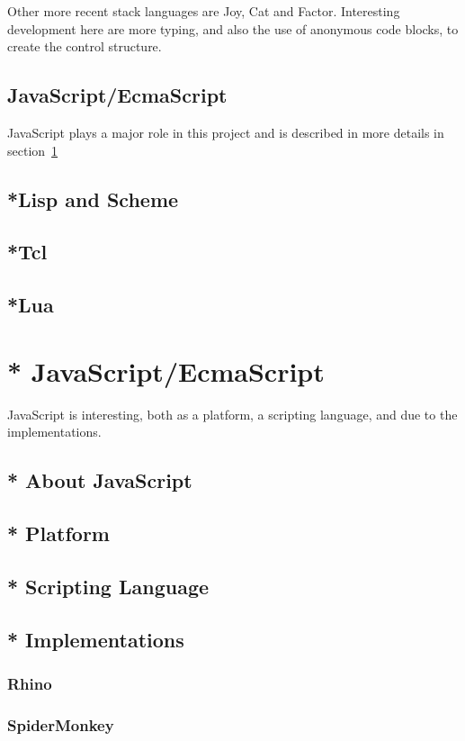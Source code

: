 Other more recent stack languages are Joy\cite{joy-language}, Cat\cite{cat-language} and Factor\cite{factor-language}.
Interesting development here are more typing, and also the use of anonymous code blocks, 
to create the control structure.

\subsection{JavaScript/EcmaScript}
JavaScript plays a major role in this project and is described in more details in section~\ref{javascript}
\subsection{*Lisp and Scheme}
\subsection{*Tcl}
\subsection{*Lua}

\section{* JavaScript/EcmaScript}
\label{javascript}
JavaScript is interesting, both as a platform, a scripting language, and due to the implementations.

\subsection{* About JavaScript}
\subsection{* Platform}
\subsection{* Scripting Language}
\subsection{* Implementations}
\subsubsection{Rhino}
\subsubsection{SpiderMonkey}
\label{spidermonkey}
